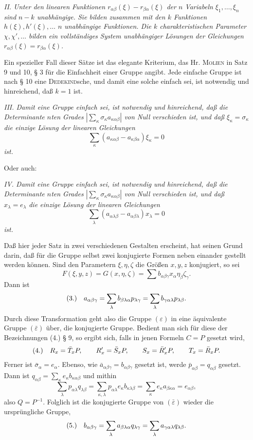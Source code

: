 \documentclass[11pt]{article}
\newcommand{\eps}{\varepsilon}
\newcommand{\fnum}[1]{\textup{(\ensuremath{#1}.)}\quad}
\begin{document}
\emph{II. Unter den linearen Funktionen $r_{\alpha\beta}(\xi)-r_{\beta\alpha}(\xi)$ der $n$ Variabeln $\xi_1,\ldots,\xi_n$ sind $n-k$ unabhängige. Sie bilden zusammen mit den $k$ Funktionen $h(\xi),h'(\xi),\ldots$ $n$ unabhängige Funktionen. Die $k$ charakteristischen Parameter $\chi,\chi',\ldots$ bilden ein vollständiges System unabhängiger Lösungen der Gleichungen $r_{\alpha\beta}(\xi)=r_{\beta\alpha}(\xi)$.}

Ein spezieller Fall dieser Sätze ist das elegante Kriterium, das Hr. \textsc{Molien} in Satz 9 und 10, § 3 für die Einfachheit einer Gruppe angibt. Jede einfache Gruppe ist nach § 10 eine \textsc{Dedekind}sche, und damit eine solche einfach sei, ist notwendig und hinreichend, daß $k=1$ ist.

\emph{III. Damit eine Gruppe einfach sei, ist notwendig und hinreichend, daß die Determinante $n$ten Grades $\left|\sum_\kappa \sigma_\kappa a_{\kappa\alpha\beta}\right|$ von Null verschieden ist, und daß $\xi_\kappa=\sigma_\kappa$ die einzige Lösung der linearen Gleichungen}
\[
 \sum_\kappa(a_{\kappa\alpha\beta}-a_{\kappa\beta\alpha})\xi_\kappa=0
\]
\emph{ist.}

Oder auch:

\emph{IV. Damit eine Gruppe einfach sei, ist notwendig und hinreichend, daß die Determinante $n$ten Grades $\left|\sum_\kappa \sigma_\kappa a_{\kappa\alpha\beta}\right|$ von Null verschieden ist, und daß $x_\lambda=e_\lambda$ die einzige Lösung der linearen Gleichungen}
\[
 \sum_\lambda(a_{\alpha\lambda\beta}-a_{\alpha\beta\lambda})x_\lambda=0
\]
\emph{ist.}

Daß hier jeder Satz in zwei verschiedenen Gestalten erscheint, hat seinen Grund darin, daß für die Gruppe selbst zwei konjugierte Formen neben einander gestellt werden können. Sind den Parametern $\xi,\eta,\zeta$ die Größen $x,y,z$ konjugiert, so sei
\[
 F(\xi,y,z)=G(x,\eta,\zeta)=\sum b_{\alpha\beta\gamma}x_\alpha\eta_\beta\zeta_\gamma.
\]
Dann ist
\[
\fnum{3} a_{\alpha\beta\gamma}=\sum_\lambda b_{\beta\lambda\alpha}p_{\lambda\gamma}
=\sum_\lambda b_{\gamma\alpha\lambda}p_{\lambda\beta}.
\]
Durch diese Transformation geht also die Gruppe $(\eps)$ in eine äquivalente Gruppe $(\bar\eps)$ über, die konjugierte Gruppe. Bedient man sich für diese der Bezeichnungen (4.) § 9, so ergibt sich, falls in jenen Formeln $C=P$ gesetzt wird,
\[
\fnum{4} R_x=\bar T_xP,
\qquad R'_x=\bar S_xP,
\qquad S_x=\bar R'_xP,
\qquad T_x=\bar R_xP.
\]
Ferner ist $\bar\sigma_\alpha=e_\alpha$. Ebenso, wie $\bar a_{\alpha\beta\gamma}=b_{\alpha\beta\gamma}$ gesetzt ist, werde $\bar p_{\alpha\beta}=q_{\alpha\beta}$ gesetzt. Dann ist $q_{\alpha\beta}=\sum_\kappa e_\kappa b_{\kappa\alpha\beta}$ und mithin
\[
 \sum_\lambda p_{\alpha\lambda}q_{\lambda\beta}
 =\sum_{\kappa,\lambda}p_{\alpha\lambda}e_\kappa b_{\kappa\lambda\beta}
 =\sum_\kappa e_\kappa a_{\beta\kappa\alpha}=e_{\alpha\beta},
\]
also $Q=P^{-1}$. Folglich ist die konjugierte Gruppe von $(\bar\eps)$ wieder die ursprüngliche Gruppe,
\[
\fnum{5} b_{\alpha\beta\gamma}=\sum_\lambda a_{\beta\lambda\alpha}q_{\lambda\gamma}
=\sum_\lambda a_{\gamma\alpha\lambda}q_{\lambda\beta}.
\]
\end{document}

